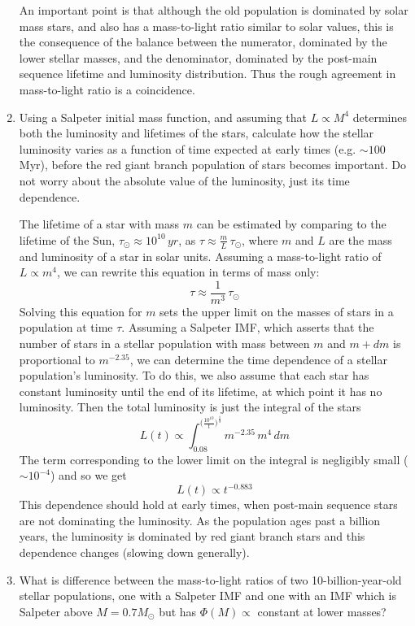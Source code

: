 \begin{enumerate}
\begin{answer}
An important point is that although the old population is dominated by
solar mass stars, and also has a mass-to-light ratio similar to solar
values, this is the consequence of the balance between the numerator,
dominated by the lower stellar masses, and the denominator, dominated
by the post-main sequence lifetime and luminosity distribution. Thus
the rough agreement in mass-to-light ratio is a coincidence.
\end{answer}
\item Using a Salpeter initial mass function, and assuming that
$L\propto M^4$ determines both the luminosity and lifetimes of the
stars, calculate how the stellar luminosity varies as a function of
time expected at early times (e.g. $\sim 100$ Myr), before the red
giant branch population of stars becomes important. Do not worry about
the absolute value of the luminosity, just its time dependence.

\begin{answer}
The lifetime of a star with mass $m$ can be estimated by comparing to
the lifetime of the Sun, $\tau_{\odot} \approx 10^{10} \, yr$, as
$\tau \approx \frac{m}{L} \, \tau_{\odot}$, where $m$ and $L$ are the
mass and luminosity of a star in solar units. Assuming a mass-to-light
ratio of $L \propto m^4$, we can rewrite this equation in terms of
mass only:
\begin{equation}
\tau \approx \frac{1}{m^3} \, \tau_{\odot}
\end{equation}
Solving this equation for $m$ sets the upper limit on the masses of
stars in a population at time $\tau$. Assuming a Salpeter IMF, which
asserts that the number of stars in a stellar population with mass
between $m$ and $m+dm$ is proportional to $m^{-2.35}$, we can
determine the time dependence of a stellar population's luminosity. To
do this, we also assume that each star has constant luminosity until
the end of its lifetime, at which point it has no luminosity. Then the
total luminosity is just the integral of the stars
\begin{equation}
L(t) \propto \int_{0.08}^{\big( \frac{10^{10}}{t} \big) ^{\frac{1}{3}}} m^{-2.35} \, m^4 \, dm
\end{equation}
The term corresponding to the lower limit on the integral is
negligibly small ($\sim 10^{-4}$) and so we get
\begin{equation}
L(t) \propto t^{-0.883}
\end{equation}
This dependence should hold at early times, when post-main sequence
stars are not dominating the luminosity. As the population ages past a
billion years, the luminosity is dominated by red giant branch stars
and this dependence changes (slowing down generally).
\end{answer}

\item What is difference between the mass-to-light ratios of two
10-billion-year-old stellar populations, one with a Salpeter IMF and
one with an IMF which is Salpeter above $M=0.7M_\odot$ but has
$\Phi(M) \propto$ constant at lower masses?
\end{enumerate} 

